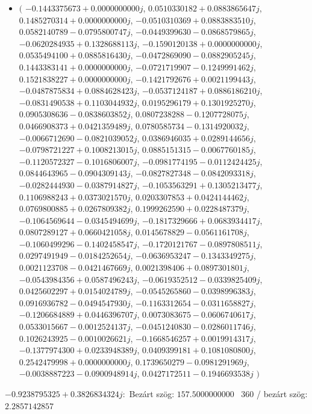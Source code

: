\documentclass[14pt,a4paper]{article}
\begin{document}
\begin{itemize}
\item
$\big($
$-0.1443375673+0.0000000000j$, $0.0510330182+0.0883865647j$, $0.1485270314+0.0000000000j$, $-0.0510310369+0.0883883510j$, $0.0582140789-0.0795800747j$, $-0.0449399630-0.0868579865j$, $-0.0620284935+0.1328688113j$, $-0.1590120138+0.0000000000j$, $0.0535494100+0.0885816430j$, $-0.0472869090-0.0882905245j$, $0.1443383141+0.0000000000j$, $-0.0721719907-0.1249991462j$, $0.1521838227+0.0000000000j$, $-0.1421792676+0.0021199443j$, $-0.0487875834+0.0884628423j$, $-0.0537124187+0.0886186210j$, $-0.0831490538+0.1103044932j$, $0.0195296179+0.1301925270j$, $0.0905308636-0.0838603852j$, $0.0807238288-0.1207728075j$, $0.0466908373+0.0421359489j$, $0.0780585734-0.1314920032j$, $-0.0066712690-0.0821039052j$, $0.0386946035+0.0289144656j$, $-0.0798721227+0.1008213015j$, $0.0885151315-0.0067760185j$, $-0.1120572327-0.1016806007j$, $-0.0981774195-0.0112424425j$, $0.0844643965-0.0904309143j$, $-0.0827827348-0.0842093318j$, $-0.0282444930-0.0387914827j$, $-0.1053563291+0.1305213477j$, $0.1106988243+0.0373021570j$, $0.0203307853+0.0424144462j$, $0.0769800885+0.0267809382j$, $0.1999262590+0.0228487379j$, $-0.1064569644-0.0345494699j$, $-0.1817329666+0.0683934417j$, $0.0807289127+0.0660421058j$, $0.0145678829-0.0561161708j$, $-0.1060499296-0.1402458547j$, $-0.1720121767-0.0897808511j$, $0.0297491949-0.0184252654j$, $-0.0636953247-0.1343349275j$, $0.0021123708-0.0421467669j$, $0.0021398406+0.0897301801j$, $-0.0543984356+0.0587496243j$, $-0.0619352512-0.0339825409j$, $0.0425602297+0.0154024789j$, $-0.0545265860-0.0398996383j$, $0.0916936782-0.0494547930j$, $-0.1163312654-0.0311658827j$, $-0.1206684889+0.0446396707j$, $0.0073083675-0.0606740617j$, $0.0533015667-0.0012524137j$, $-0.0451240830-0.0286011746j$, $0.1026243925-0.0010026621j$, $-0.1668546257+0.0019914317j$, $-0.1377974300+0.0233948389j$, $0.0409399181+0.1081080800j$, $0.2542479998+0.0000000000j$, $0.1739650279-0.0981291969j$, $-0.0038887223-0.0900948914j$, $0.0427172511-0.1946693538j$
$\big)$
\end{itemize}
$-0.9238795325+0.3826834324j$:\
Bezárt szög: $157.5000000000$ \
360 / bezárt szög: $2.2857142857$\
\end{document}
